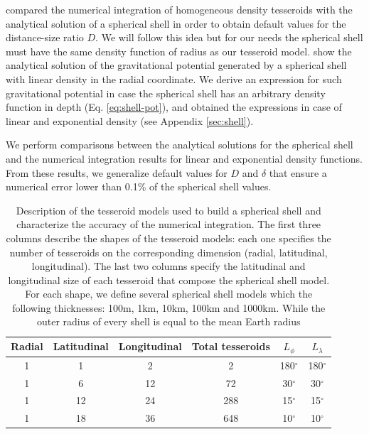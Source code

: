 \documentclass[extra, referee]{gji}
\begin{document}
\citet{Uieda2016} compared the numerical integration of homogeneous density tesseroids
with the analytical solution of a spherical shell \citep{Mikuska2006,Grombein2013} in
order to obtain default values for the distance-size ratio $D$.
We will follow this idea but for our needs the spherical shell must
have the same density function of radius as our tesseroid model.
\citet{Lin2018} show the analytical solution of the gravitational potential generated by
a spherical shell with linear density in the radial coordinate.
We derive an expression for such gravitational potential in case the spherical shell has
an arbitrary density function in depth (Eq. \ref{eq:shell-pot}), and obtained the
expressions in case of linear and exponential density (see Appendix \ref{sec:shell}).

We perform comparisons between the analytical solutions for the spherical shell and the
numerical integration results for linear and exponential density functions.
From these results, we generalize default values for $D$ and $\delta$ that ensure a
numerical error lower than 0.1\% of the spherical shell values.

\begin{table}
\caption{
    Description of the tesseroid models used to build a spherical shell and characterize
    the accuracy of the numerical integration.
    The first three columns describe the shapes of the tesseroid models: each one
    specifies the number of tesseroids on the corresponding dimension (radial,
    latitudinal, longitudinal).
    The last two columns specify the latitudinal and longitudinal size of each
    tesseroid that compose the spherical shell model.
    For each shape, we define several spherical shell models which the following
    thicknesses: 100m, 1km, 10km, 100km and 1000km.
    While the outer radius of every shell is equal to the mean Earth radius
}
\label{tab:tess-models}
\begin{tabular}{cccccc}
    Radial & Latitudinal & Longitudinal  & Total tesseroids & $L_\phi$ & $L_\lambda$
    \\ \hline
    1 & 1  & 2  & 2   & 180$^\circ$ & 180$^\circ$ \\
    1 & 6  & 12 & 72  &  30$^\circ$ &  30$^\circ$ \\
    1 & 12 & 24 & 288 &  15$^\circ$ &  15$^\circ$ \\
    1 & 18 & 36 & 648 &  10$^\circ$ &  10$^\circ$ \\
\end{tabular}
\end{table}
\end{document}
